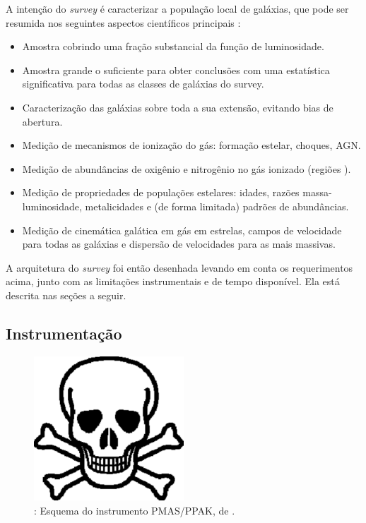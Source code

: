 A intenção do {\em survey} é caracterizar a população local de galáxias, que
pode ser resumida nos seguintes aspectos científicos principais
\citep{Sanchez2012}:
\begin{itemize}
  \item Amostra cobrindo uma fração substancial da função de luminosidade.
  \item Amostra grande o suficiente para obter conclusões com uma estatística
  significativa para todas as classes de galáxias do survey.
  \item Caracterização das galáxias sobre toda a sua extensão, evitando bias de
  abertura.
  \item Medição de mecanismos de ionização do gás: formação estelar, choques,
  AGN.
  \item Medição de abundâncias de oxigênio e nitrogênio no gás ionizado (regiões
  \HII).
  \item Medição de propriedades de populações estelares: idades, razões
  massa-luminosidade, metalicidades e (de forma limitada) padrões de
  abundâncias.
  \item Medição de cinemática galática em gás em estrelas, campos de velocidade
  para todas as galáxias e dispersão de velocidades para as mais massivas.
\end{itemize}
A arquitetura do {\em survey} foi então desenhada levando em conta os
requerimentos acima, junto com as limitações instrumentais e de tempo
disponível. Ela está descrita nas seções a seguir.

\subsection{Instrumentação}
\label{sec:ifs:instrumentacao}

\begin{figure}
	\includegraphics[width=0.5\textwidth]{figuras/test.pdf}
	\caption[Esquema do instrumento PMAS/PPAK.]
	{\TODO: Esquema do instrumento PMAS/PPAK, de \citet{Kelz2006}.}
	\label{fig:PPAK}
\end{figure}

